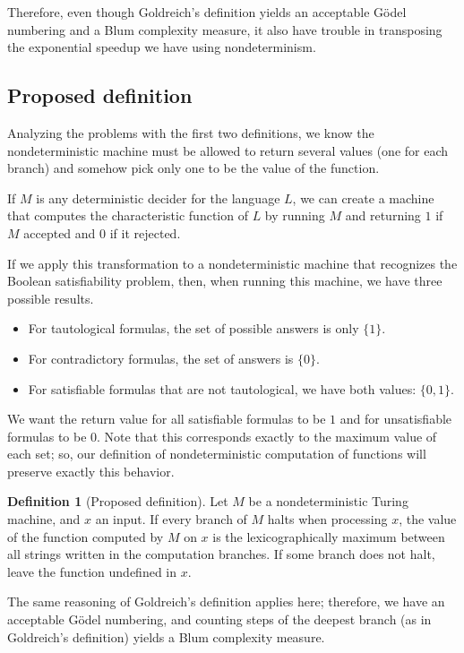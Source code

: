 \documentclass[12pt]{article}
\theoremstyle{definition}
\newtheorem{definition}{Definition}
\begin{document}
Therefore, even though Goldreich's definition
yields an acceptable Gödel numbering and a Blum complexity measure,
it also have trouble in transposing the exponential speedup
we have using nondeterminism.

\subsection{Proposed definition}
\label{sec:proposed}

Analyzing the problems with the first two definitions,
we know the nondeterministic machine must be allowed to return several values
(one for each branch)
and somehow pick only one to be the value of the function.

If $M$ is any deterministic decider for the language $L$,
we can create a machine that computes the characteristic function of $L$
by running $M$ and returning $1$ if $M$ accepted and $0$ if it rejected.

If we apply this transformation to a nondeterministic machine
that recognizes the Boolean satisfiability problem,
then, when running this machine,
we have three possible results.
\begin{itemize}
    \item For tautological formulas,
        the set of possible answers is only $\{1\}$.
    \item For contradictory formulas,
        the set of answers is $\{0\}$.
    \item For satisfiable formulas that are not tautological,
        we have both values: $\{0, 1\}$.
\end{itemize}
We want the return value for all satisfiable formulas to be $1$
and for unsatisfiable formulas to be $0$.
Note that this corresponds exactly to the maximum value of each set;
so,
our definition of nondeterministic computation of functions
will preserve exactly this behavior.

\begin{definition}[Proposed definition]
    Let $M$ be a nondeterministic Turing machine,
    and $x$ an input.
    If every branch of $M$ halts when processing $x$,
    the value of the function computed by $M$ on $x$
    is the lexicographically maximum
    between all strings written in the computation branches.
    If some branch does not halt, leave the function undefined in $x$.
\end{definition}

The same reasoning of Goldreich's definition applies here;
therefore, we have an acceptable Gödel numbering,
and counting steps of the deepest branch
(as in Goldreich's definition)
yields a Blum complexity measure.
\end{document}
